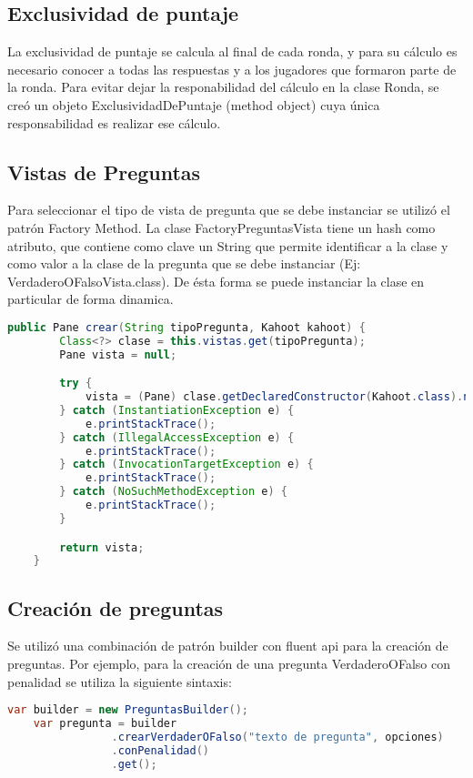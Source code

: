 \documentclass[titlepage,a4paper]{article}
\begin{document}
\subsection{Exclusividad de puntaje} La exclusividad de puntaje se calcula al final de cada ronda, y para su cálculo es necesario conocer a todas las respuestas y a los jugadores que formaron parte de la ronda. Para evitar dejar la responabilidad del cálculo en la clase Ronda, se creó un objeto ExclusividadDePuntaje (method object) cuya única responsabilidad es realizar ese cálculo.
\subsection{Vistas de Preguntas} Para seleccionar el tipo de vista de pregunta que se debe instanciar se utilizó el patrón Factory Method. La clase FactoryPreguntasVista tiene un hash como atributo, que contiene como clave un String que permite identificar a la clase y como valor a la clase de la pregunta que se debe instanciar (Ej: VerdaderoOFalsoVista.class). De ésta forma se puede instanciar la clase en particular de forma dinamica.
\begin{lstlisting}[language=java]
    public Pane crear(String tipoPregunta, Kahoot kahoot) {
        Class<?> clase = this.vistas.get(tipoPregunta);
        Pane vista = null;

        try {
            vista = (Pane) clase.getDeclaredConstructor(Kahoot.class).newInstance(kahoot);
        } catch (InstantiationException e) {
            e.printStackTrace();
        } catch (IllegalAccessException e) {
            e.printStackTrace();
        } catch (InvocationTargetException e) {
            e.printStackTrace();
        } catch (NoSuchMethodException e) {
            e.printStackTrace();
        }

        return vista;
    }

\end{lstlisting}

\subsection{Creación de preguntas} Se utilizó una combinación de patrón builder con fluent api para la creación de preguntas. Por ejemplo, para la creación de una pregunta VerdaderoOFalso con penalidad se utiliza la siguiente sintaxis:
\begin{lstlisting}[language=java]
    var builder = new PreguntasBuilder();
    var pregunta = builder
                .crearVerdaderOFalso("texto de pregunta", opciones)
                .conPenalidad()
                .get();
\end{lstlisting}
\end{document}
